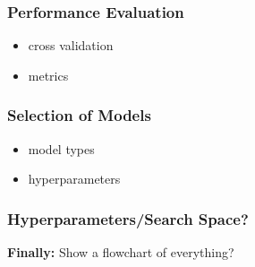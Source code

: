 
\subsubsection{Performance Evaluation}
\begin{itemize}[noitemsep]
	\item cross validation
	\item metrics
\end{itemize}



\subsubsection{Selection of Models}

\begin{itemize}[noitemsep]
	\item model types
	\item hyperparameters
\end{itemize}

\subsubsection{Hyperparameters/Search Space?}


\textbf{Finally:} Show a flowchart of everything?






